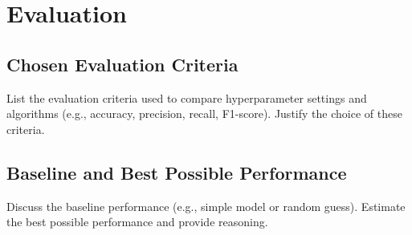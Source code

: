 \section{Evaluation}

\subsection{Chosen Evaluation Criteria}
List the evaluation criteria used to compare hyperparameter settings and algorithms (e.g., accuracy, precision, recall, F1-score). Justify the choice of these criteria.

\subsection{Baseline and Best Possible Performance}
Discuss the baseline performance (e.g., simple model or random guess). Estimate the best possible performance and provide reasoning.
